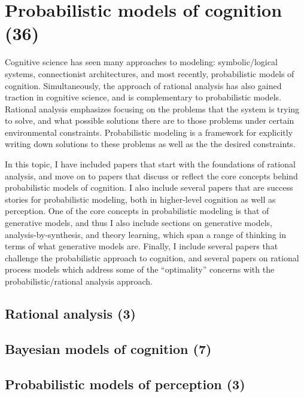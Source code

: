 \documentclass{article}
\begin{document}
\section{Probabilistic models of cognition (36)}

Cognitive science has seen many approaches to modeling: symbolic/logical systems, connectionist architectures, and most recently, probabilistic models of cognition.
Simultaneously, the approach of rational analysis has also gained traction in cognitive science, and is complementary to probabilistic models.
Rational analysis emphasizes focusing on the problems that the system is trying to solve, and what possible solutions there are to those problems under certain environmental constraints.
Probabilistic modeling is a framework for explicitly writing down solutions to these problems as well as the the desired constraints.

In this topic, I have included papers that start with the foundations of rational analysis, and move on to papers that discuss or reflect the core concepts behind probabilistic models of cognition.
I also include several papers that are success stories for probabilistic modeling, both in higher-level cognition as well as perception.
One of the core concepts in probabilistic modeling is that of generative models, and thus I also include sections on generative models, analysis-by-synthesis, and theory learning, which span a range of thinking in terms of what generative models are.
Finally, I include several papers that challenge the probabilistic approach to cognition, and several papers on rational process models which address some of the ``optimality'' concerns with the probabilistic/rational analysis approach.

\subsection{Rational analysis (3)}

\subsection{Bayesian models of cognition (7)}

\subsection{Probabilistic models of perception (3)}
\end{document}
